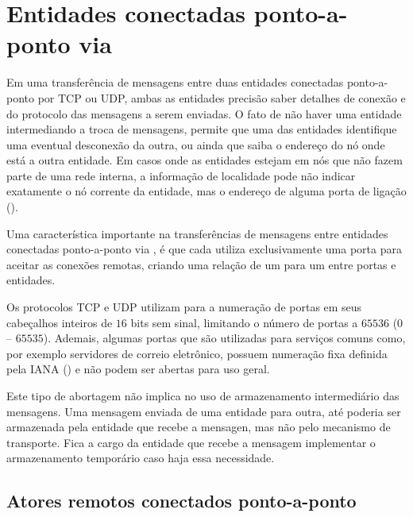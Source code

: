\section{Entidades conectadas ponto-a-ponto via }
\label{sec:entidades-ponto-a-ponto}

Em uma transferência de mensagens entre duas entidades conectadas 
ponto-a-ponto por  TCP ou UDP, ambas as entidades precisão saber
detalhes de conexão e do protocolo das mensagens a serem enviadas. 
O fato de não haver uma entidade intermediando a troca
de mensagens, permite que uma das entidades identifique uma eventual desconexão
da outra, ou ainda que saiba o endereço do nó onde está a outra entidade.
Em casos onde as entidades estejam em nós que não fazem parte de uma rede interna,
a informação de localidade pode não indicar exatamente o nó corrente da entidade, 
mas o endereço de alguma porta de ligação (). 

Uma característica importante na transferências de mensagens entre entidades 
conectadas ponto-a-ponto via , é que cada  utiliza 
exclusivamente uma porta para aceitar as conexões remotas, criando uma relação de um 
para um entre portas e entidades. 

Os protocolos TCP e UDP utilizam para a numeração
de portas em seus cabeçalhos inteiros de $16$ bits sem sinal, limitando o número de
portas a $65536$ ($0$ -- $65535$)\cite{tcp}. Ademais, algumas portas que são utilizadas 
para serviços comuns como, por exemplo servidores de correio eletrônico, 
possuem numeração fixa definida pela IANA ()
e não podem ser abertas para uso geral. 



Este tipo de abortagem não implica no uso de armazenamento intermediário das mensagens. Uma
mensagem enviada de uma entidade para outra, até poderia ser armazenada pela entidade que 
recebe a mensagen, mas não pelo mecanismo de transporte. Fica a cargo da entidade que recebe 
a mensagem implementar o armazenamento temporário caso haja essa necessidade.

\subsection{Atores remotos conectados ponto-a-ponto}
\label{subsec:atores-remotos-ponto-a-ponto}

